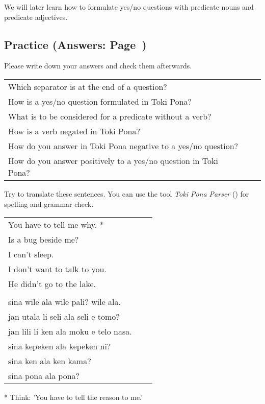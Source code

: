 We will later learn how to formulate yes/no questions with predicate nouns and predicate adjectives.
%
\newpage
%
\subsection*{Practice (Answers: Page~\pageref{'negation_yes_no_questions'})}
%
Please write down your answers and check them afterwards. 

\begin{supertabular}{p{5,5cm}|ll}
Which separator is at the end of a question? &&  \\ %
How is a yes/no question formulated in Toki Pona? &&   \\ %
What is to be considered for a predicate without a verb? &&   \\ %
How is a verb negated in Toki Pona? &&  \\ %
How do you answer in Toki Pona negative to a yes/no question? &&  \\ %
How do you answer positively to a yes/no question in Toki Pona? &&  \\ %
\end{supertabular} 

Try to translate these sentences. 
You can use the tool \textit{Toki Pona Parser} (\cite{www:rowa:02}) for spelling and grammar check. 

\begin{supertabular}{p{5,5cm}|ll}
You have to tell me why. *  &&   \\ %
Is a bug beside me?  &&    \\ %
I can't sleep.  &&    \\ %
I don't want to talk to you.  &&    \\ %
He didn't go to the lake.   &&   \\ %
 && \\ %
sina wile ala wile pali? wile ala.  &&    \\ %
jan utala li seli ala seli e tomo?   &&   \\ %
jan lili li ken ala moku e telo nasa.   &&   \\ %
sina kepeken ala kepeken ni?  &&    \\ %
sina ken ala ken kama?   &&   \\ %
sina pona ala pona? &&   \\ %
\end{supertabular} 

* Think: 'You have to tell the reason to me.' 
